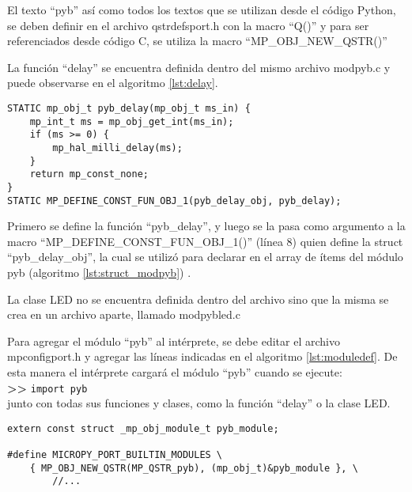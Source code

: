 El texto “pyb” así como todos los textos que se utilizan desde el código Python, se deben definir en el archivo qstrdefsport.h con la macro “Q()” y para ser referenciados desde código C, se utiliza la macro “MP\_OBJ\_NEW\_QSTR()”

La función “delay” se encuentra definida dentro del mismo archivo modpyb.c y puede observarse en el algoritmo \ref{lst:delay}.

\begin{lstlisting}[label={lst:delay},caption=Definición de la función de C que se ejecuta al invocar la función delay desde Python.] 
STATIC mp_obj_t pyb_delay(mp_obj_t ms_in) {
    mp_int_t ms = mp_obj_get_int(ms_in);
    if (ms >= 0) {
        mp_hal_milli_delay(ms);
    }
    return mp_const_none;
}
STATIC MP_DEFINE_CONST_FUN_OBJ_1(pyb_delay_obj, pyb_delay);

\end{lstlisting}

Primero se define la función “pyb\_delay”, y luego se la pasa como argumento a la macro “MP\_DEFINE\_CONST\_FUN\_OBJ\_1()” (línea 8) quien define la struct “pyb\_delay\_obj”, la cual se utilizó para declarar en el array de ítems del módulo pyb (algoritmo \ref{lst:struct_modpyb}) .

La clase LED no se encuentra definida dentro del archivo sino que la misma se crea en un archivo aparte, llamado modpybled.c

Para agregar el módulo “pyb” al intérprete, se debe editar el archivo mpconfigport.h y agregar las líneas indicadas en el algoritmo \ref{lst:moduledef}. De esta manera el intérprete cargará el módulo “pyb” cuando se ejecute:\\
\textbf{{\fontsize{16}{16}\selectfont \textgreater\textgreater}} \texttt{import pyb}\\
junto con todas sus funciones y clases, como la función “delay” o la clase LED.


\begin{lstlisting}[label={lst:moduledef},caption=Inclusión del módulo pyb a la lista de módulos disponibles.] 
extern const struct _mp_obj_module_t pyb_module;

#define MICROPY_PORT_BUILTIN_MODULES \
    { MP_OBJ_NEW_QSTR(MP_QSTR_pyb), (mp_obj_t)&pyb_module }, \
		//...
		
\end{lstlisting}


